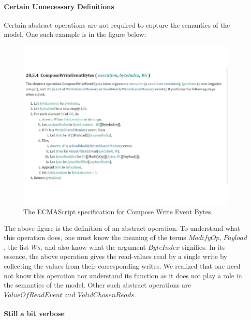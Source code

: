 \paragraph{Certain Unnecessary Definitions}
    
    Certain abstract operations are not required to capture the semantics of the model. 
    One such example is in the figure below:
    \begin{figure}[H]
        \centering 
        \includegraphics[scale=0.6]{4.ECMAScriptMemoryModel/ECMAScriptStd.pdf}
        \caption{The ECMAScript specification for Compose Write Event Bytes.}
    \end{figure}
    The above figure is the definition of an abstract operation. To understand what this operation does, one must know the meaning of the terms $ModifyOp$, $Payload$, the list $Ws$, and also know what the argument $ByteIndex$ signifies. 
    In its essence, the above operation gives the read-values read by a single write by collecting the values from their corresponding writes. 
    We realized that one need not know this operation nor understand its function as it does not play a role in the semantics of the model. 
    Other such abstract operations are $ValueOfReadEvent$ and $ValidChosenReads$. 

\paragraph{Still a bit verbose}
    
